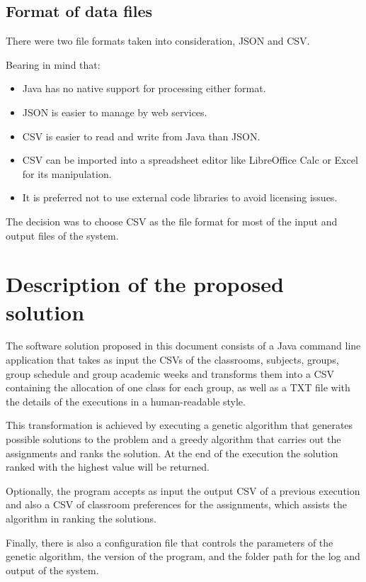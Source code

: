 \subsection{Format of data files}

There were two file formats taken into consideration, JSON and CSV.

Bearing in mind that:

\begin{itemize}
    \item Java has no native support for processing either format.
    \item JSON is easier to manage by web services.
    \item CSV is easier to read and write from Java than JSON.
    \item CSV can be imported into a spreadsheet editor like LibreOffice Calc or Excel for its manipulation.
    \item It is preferred not to use external code libraries to avoid licensing issues.
\end{itemize}

The decision was to choose CSV as the file format for most of the input and output files of the system.

\section{Description of the proposed solution}

The software solution proposed in this document consists of a Java command line application that takes as input the CSVs of the classrooms, subjects, groups, group schedule and group academic weeks and transforms them into a CSV containing the allocation of one class for each group, as well as a TXT file with the details of the executions in a human-readable style.

This transformation is achieved by executing a genetic algorithm that generates possible solutions to the problem and a greedy algorithm that carries out the assignments and ranks the solution. At the end of the execution the solution ranked with the highest value will be returned.

Optionally, the program accepts as input the output CSV of a previous execution and also a CSV of classroom preferences for the assignments, which assists the algorithm in ranking the solutions.

Finally, there is also a configuration file that controls the parameters of the genetic algorithm, the version of the program, and the folder path for the log and output of the system.

